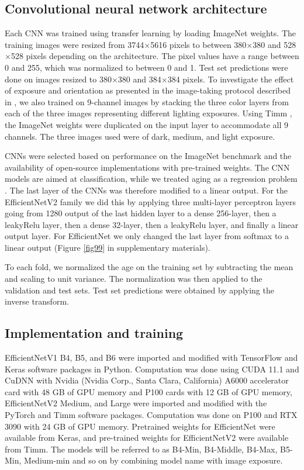 \documentclass[10pt,letterpaper]{article}
\begin{document}
\subsection{Convolutional neural network architecture}


Each CNN was trained using transfer learning by loading ImageNet weights. The training images were resized from 3744$\times$5616 pixels to between 380$\times$380 and 528$\times$528 pixels
depending on the architecture. The pixel values have a range between 0 and 255, which was normalized to between 0 and 1. Test set predictions were done on images resized to 380$\times$380 and 384$\times$384 pixels. To investigate the effect of exposure and orientation as presented in the image-taking protocol described in \citep{codOtolithsMyers}, we also trained on 9-channel images by stacking the three color layers from each of the three images representing different lighting exposures. Using Timm \citep{rw2019timm}, the ImageNet weights were duplicated on the input layer to accommodate all 9 channels. The three images used were of dark, medium, and light exposure. 

CNNs were selected based on performance on the ImageNet benchmark and the availability of open-source implementations with pre-trained weights. The CNN models are aimed at classification, while we treated aging as a regression problem \citep{moenetal, vaboeetal}. The last layer of the CNNs was therefore modified to  a linear output. For the EfficientNetV2 family we did this by applying three multi-layer perceptron layers going from 1280 output of the last hidden layer to a dense 256-layer, 
then a leakyRelu \citep{DBLP:journals/corr/XuWCL15} layer, then a dense 32-layer, then a leakyRelu layer, and finally a linear output layer. For EfficientNet we only changed the last layer from softmax to a linear output (Figure \ref{fig99} in supplementary materials).

To each fold, we normalized the age on the training set by subtracting the mean and scaling to unit variance. The normalization was then applied to the validation and test sets. Test set predictions were obtained by applying the inverse transform.

\subsection{Implementation and training}

EfficientNetV1 B4, B5, and B6 were imported and modified with TensorFlow \citep{abadi2016tensorflow} and Keras \citep{keras} software packages in Python. Computation was done using CUDA 11.1 and CuDNN with Nvidia (Nvidia Corp., Santa Clara, California) A6000 accelerator card with 48 GB of GPU memory and P100 cards with 12 GB of GPU memory,
EfficientNetV2 Medium, and Large were imported and modified with the PyTorch \citep{NEURIPS2019_9015}  and Timm \citep{rw2019timm} software packages. Computation was done on P100 and RTX 3090 with 24 GB of GPU memory. Pretrained weights for EfficientNet were available from Keras, and pre-trained weights for EfficientNetV2 were available from Timm. The models will be referred to as B4-Min, B4-Middle, B4-Max, B5-Min, Medium-min and so on by combining model name with image exposure.
\end{document}
